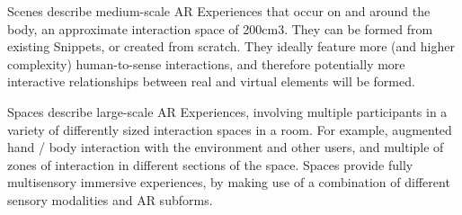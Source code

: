Scenes describe medium-scale AR Experiences that occur on and around the body, an approximate interaction space of 200cm3. They can be formed from existing Snippets, or created from scratch. They ideally feature more (and higher complexity) human-to-sense interactions, and therefore potentially more interactive relationships between real and virtual elements will be formed.

Spaces describe large-scale AR Experiences, involving multiple participants in a variety of differently sized interaction spaces in a room. For example, augmented hand / body interaction with the environment and other users, and multiple of zones of interaction in different sections of the space. Spaces provide fully multisensory immersive experiences, by making use of a combination of different sensory modalities and AR subforms.

